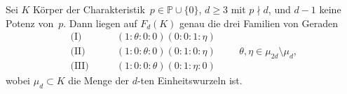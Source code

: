 \begin{fact}
Sei $K$ Körper der Charakteristik~$p \in \mathbb P \cup \{0\}$, $d \geq 3$ mit $p \nmid d$, und $d-1$ keine Potenz von~$p$. Dann liegen auf $F_d(K)$ genau die drei Familien von Geraden
\begin{equation} \label{eq:regular}
\begin{split}
\text{(I)}\qquad	&(1:\theta:0:0)(0:0:1:\eta) \\
\text{(II)}\qquad	&(1:0:\theta:0)(0:1:0:\eta) \\
\text{(III)}\qquad	&(1:0:0:\theta)(0:1:\eta:0)
\end{split} \qquad \theta, \eta \in \mu_{2d} \setminus \mu_d,
\end{equation}
wobei $\mu_d \subset K$ die Menge der $d$-ten Einheitswurzeln ist.
\end{fact}
